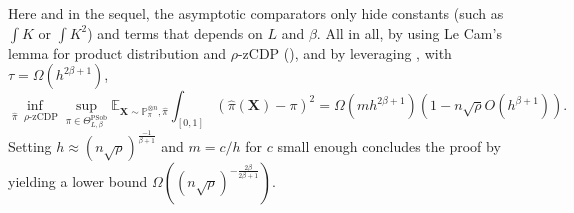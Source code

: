 \documentclass[10pt]{article} %
\newcommand{\Prob}[0]{\mathbb{P}}
\newcommand{\E}[0]{\mathbb{E}}
\newcommand\vect[1]{\mathbf{#1}}
\newcommand\tv[2]{\mathrm{TV}\left( {#1}, {#2} \right)}
\newcommand\p[1]{\left( {#1}\right)}
\newcommand\RG[1]{\textcolor{red}{#1}}
\begin{document}


Here and in the sequel, the asymptotic comparators only hide constants (such as $\int K$ or $\int K^2$) and terms that depends on $L$ and $\beta$.
All in all, by using Le Cam's lemma %
for product distribution and $\rho$-zCDP (),  and by leveraging , with $\tau = \Omega(h^{2\beta+1})$, 
\begin{equation}
    \inf_{\hat{\pi} \text{ $\rho$-zCDP}} \sup_{\pi \in  \Theta^{\text{PSob}}_{L, \beta}}
    \E_{\vect{X} \sim \Prob_{\pi}^{\otimes n}, \hat{\pi}} \int_{[0, 1]}\p{\hat{\pi}(\vect{X})- \pi}^2 = \Omega \p{m h^{2 \beta + 1}} \p{1 - n \sqrt{\rho} O \p{h^{\beta + 1}}}.
\end{equation}
Setting $h \approx \p{n \sqrt{\rho}}^{\frac{-1}{\beta + 1}}$ and $m = c/h$ for $c$ small enough concludes the proof by yielding a lower bound $\Omega\p{\p{n\sqrt{\rho}}^{-\frac{2\beta}{2\beta+1}}}$.
\end{document}
